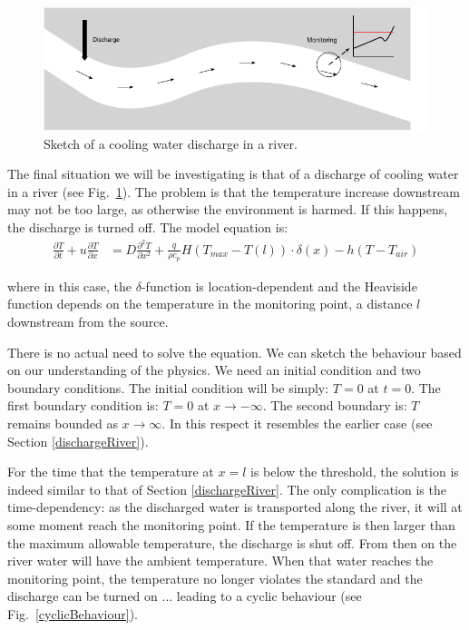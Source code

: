 \documentclass[onecolumn]{article}
\begin{document}
\begin{figure}
\begin{center}
\includegraphics{river_sketch.pdf}
\caption{Sketch of a cooling water discharge in a river.}
\label{riverSketch}
\end{center}
\end{figure}

The final situation we will be investigating is that of a discharge of cooling water in a river (see Fig.\ \ref{riverSketch}). The
problem is that the temperature increase downstream may not be too large, as otherwise the environment
is harmed. If this happens, the discharge is turned off. The model equation is:
%
\begin{align}
    \frac{\partial T}{\partial t} + u \frac{\partial T}{\partial x} &= D \frac{\partial^2 T}{\partial x^2} +
                \frac{q}{\rho c_p} H(T_{max} - T(l)) \cdot \delta(x) - h(T - T_{air})
\end{align}

\noindent where in this case, the $\delta$-function is location-dependent and the Heaviside function depends
on the temperature in the monitoring point, a distance $l$ downstream from the source.

There is no actual need to solve the equation. We can sketch the behaviour based on our understanding of the physics. We need
an initial condition and two boundary conditions. The initial condition will be simply: $T = 0$ at $t = 0$.
The first boundary condition is: $T = 0$ at $x \rightarrow -\infty$. The second boundary is:
$T$ remains bounded as $x \rightarrow \infty$. In this respect it resembles the earlier case (see Section \ref{dischargeRiver}).

For the time that the temperature at $x = l$ is below the threshold, the solution is indeed similar
to that of Section \ref{dischargeRiver}. The only complication is the time-dependency: as the discharged
water is transported along the river, it will at some moment reach the monitoring point. If the temperature
is then larger than the maximum allowable temperature, the discharge is shut off. From then on the river
water will have the ambient temperature. When that water reaches the monitoring point, the temperature
no longer violates the standard and the discharge can be turned on ... leading to a cyclic behaviour
(see Fig.\ \ref{cyclicBehaviour}).
\end{document}
